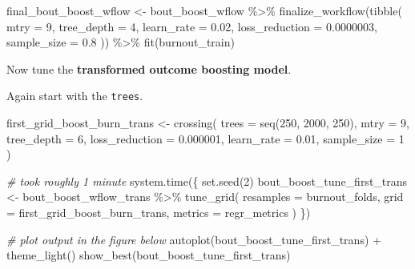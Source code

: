 \documentclass[
]{book}
\newenvironment{Shaded}{\begin{snugshade}}{\end{snugshade}}
\newcommand{\AttributeTok}[1]{\textcolor[rgb]{0.77,0.63,0.00}{#1}}
\newcommand{\CommentTok}[1]{\textcolor[rgb]{0.56,0.35,0.01}{\textit{#1}}}
\newcommand{\DecValTok}[1]{\textcolor[rgb]{0.00,0.00,0.81}{#1}}
\newcommand{\FloatTok}[1]{\textcolor[rgb]{0.00,0.00,0.81}{#1}}
\newcommand{\FunctionTok}[1]{\textcolor[rgb]{0.00,0.00,0.00}{#1}}
\newcommand{\NormalTok}[1]{#1}
\newcommand{\OtherTok}[1]{\textcolor[rgb]{0.56,0.35,0.01}{#1}}
\newcommand{\SpecialCharTok}[1]{\textcolor[rgb]{0.00,0.00,0.00}{#1}}
\begin{document}
\begin{Shaded}
\begin{Highlighting}[]
\NormalTok{final\_bout\_boost\_wflow }\OtherTok{\textless{}{-}} 
\NormalTok{  bout\_boost\_wflow }\SpecialCharTok{\%\textgreater{}\%} 
  \FunctionTok{finalize\_workflow}\NormalTok{(}\FunctionTok{tibble}\NormalTok{(}
    \AttributeTok{mtry =} \DecValTok{9}\NormalTok{,}
    \AttributeTok{tree\_depth =} \DecValTok{4}\NormalTok{,}
    \AttributeTok{learn\_rate =} \FloatTok{0.02}\NormalTok{,}
    \AttributeTok{loss\_reduction =} \FloatTok{0.0000003}\NormalTok{,}
    \AttributeTok{sample\_size =} \FloatTok{0.8}
\NormalTok{  )) }\SpecialCharTok{\%\textgreater{}\%}
  \FunctionTok{fit}\NormalTok{(burnout\_train)}
\end{Highlighting}
\end{Shaded}

Now tune the \textbf{transformed outcome boosting model}.

Again start with the \texttt{trees}.

\begin{Shaded}
\begin{Highlighting}[]
\NormalTok{first\_grid\_boost\_burn\_trans }\OtherTok{\textless{}{-}} \FunctionTok{crossing}\NormalTok{(}
  \AttributeTok{trees =} \FunctionTok{seq}\NormalTok{(}\DecValTok{250}\NormalTok{, }\DecValTok{2000}\NormalTok{, }\DecValTok{250}\NormalTok{),}
  \AttributeTok{mtry =} \DecValTok{9}\NormalTok{,}
  \AttributeTok{tree\_depth =} \DecValTok{6}\NormalTok{,}
  \AttributeTok{loss\_reduction =} \FloatTok{0.000001}\NormalTok{,}
  \AttributeTok{learn\_rate =} \FloatTok{0.01}\NormalTok{,}
  \AttributeTok{sample\_size =} \DecValTok{1}
\NormalTok{)}
\end{Highlighting}
\end{Shaded}

\begin{Shaded}
\begin{Highlighting}[]
\CommentTok{\# took roughly 1 minute}
\FunctionTok{system.time}\NormalTok{(\{}
  \FunctionTok{set.seed}\NormalTok{(}\DecValTok{2}\NormalTok{)}
\NormalTok{  bout\_boost\_tune\_first\_trans }\OtherTok{\textless{}{-}}\NormalTok{ bout\_boost\_wflow\_trans }\SpecialCharTok{\%\textgreater{}\%}
    \FunctionTok{tune\_grid}\NormalTok{(}
      \AttributeTok{resamples =}\NormalTok{  burnout\_folds,}
      \AttributeTok{grid =}\NormalTok{ first\_grid\_boost\_burn\_trans,}
      \AttributeTok{metrics =}\NormalTok{ regr\_metrics}
\NormalTok{    )}
\NormalTok{\})}

\CommentTok{\# plot output in the figure below}
\FunctionTok{autoplot}\NormalTok{(bout\_boost\_tune\_first\_trans) }\SpecialCharTok{+} \FunctionTok{theme\_light}\NormalTok{()}
\FunctionTok{show\_best}\NormalTok{(bout\_boost\_tune\_first\_trans)}
\end{Highlighting}
\end{Shaded}
\end{document}

